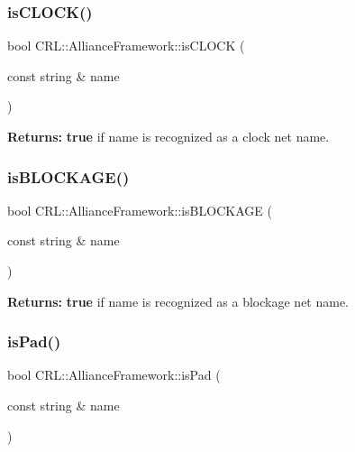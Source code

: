 \subsubsection{\texorpdfstring{is\+C\+L\+O\+C\+K()}{isCLOCK()}}
{\footnotesize\ttfamily bool C\+R\+L\+::\+Alliance\+Framework\+::is\+C\+L\+O\+CK (\begin{DoxyParamCaption}\item[{const string \&}]{name }\end{DoxyParamCaption})\hspace{0.3cm}{\ttfamily [inline]}}

{\bfseries Returns\+:} {\bfseries true} if {\ttfamily name} is recognized as a clock net name. \mbox{\label{classCRL_1_1AllianceFramework_aa41d24d292c19624236fff250a28b102}} 
\subsubsection{\texorpdfstring{is\+B\+L\+O\+C\+K\+A\+G\+E()}{isBLOCKAGE()}}
{\footnotesize\ttfamily bool C\+R\+L\+::\+Alliance\+Framework\+::is\+B\+L\+O\+C\+K\+A\+GE (\begin{DoxyParamCaption}\item[{const string \&}]{name }\end{DoxyParamCaption})\hspace{0.3cm}{\ttfamily [inline]}}

{\bfseries Returns\+:} {\bfseries true} if {\ttfamily name} is recognized as a blockage net name. \mbox{\label{classCRL_1_1AllianceFramework_a0c48b5b15d769c6f17c4098dcaf46bcd}} 
\subsubsection{\texorpdfstring{is\+Pad()}{isPad()}}
{\footnotesize\ttfamily bool C\+R\+L\+::\+Alliance\+Framework\+::is\+Pad (\begin{DoxyParamCaption}\item[{const string \&}]{name }\end{DoxyParamCaption})\hspace{0.3cm}{\ttfamily [inline]}}

